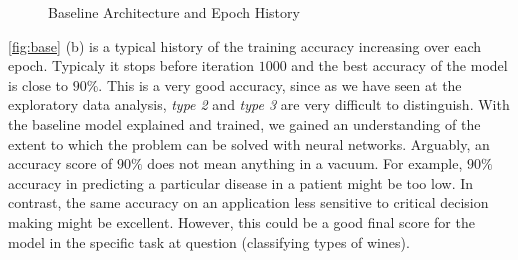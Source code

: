 \documentclass[11pt,twoside]{article}
\numberwithin{Theorem}{section}
\numberwithin{Definition}{section}
\numberwithin{Lemma}{section}
\numberwithin{Algorithm}{section}
\numberwithin{equation}{section}
\begin{document}
\begin{figure}
{{}
}%
\label{fig:base}
\caption{Baseline Architecture and Epoch History}
\end{figure}
\autoref{fig:base} (b) is a typical history of the training accuracy increasing over each epoch. Typicaly it stops before iteration $1000$ and the best accuracy of the model is close to $90\%$. This is a very good accuracy, since as we have seen at the exploratory data analysis, \textit{type 2} and \textit{type 3} are very difficult to distinguish.
With the baseline model explained and trained, we gained an understanding of the extent to which the problem can be solved with neural networks. Arguably, an accuracy score of $90\%$ does not mean anything in a vacuum. For example, $90\%$ accuracy in predicting a particular disease in a patient might be too low. In contrast, the same accuracy on an application less sensitive to critical decision making might be excellent. However, this could be a good final score for the model in the specific task at question (classifying types of wines).
\end{document}
